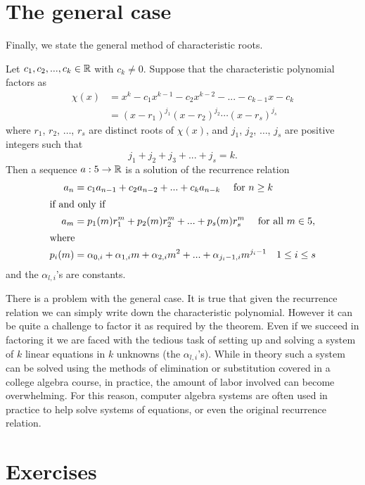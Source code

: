 \section{The general case}
Finally, we state the general method of characteristic roots.
 
\begin{thm}
 Let $c_1, c_2, ..., c_k\in \mathbb{R}$ with $c_k\neq 0$. Suppose that the characteristic polynomial
 factors as
\begin{align*}
 \chi(x) &=x^k-c_1x^{k-1}-c_2x^{k-2}-...-c_{k-1}x-c_k \\
         &=(x-r_1)^{j_1}(x-r_2)^{j_2} \cdots (x-r_s)^{j_s}
\end{align*}
where $r_1$, $r_2$, $\ldots$, $r_s$ are distinct roots of $\chi(x)$, and $j_1$, $j_2$, $\ldots$, $j_s$ are positive integers such that 
\[
  j_1+j_2+j_3+...+j_s=k.
\]
 Then a sequence $a:5\to\mathbb{R}$ is a solution of the recurrence relation
\begin{align*}
 a_n&=c_1a_{n-1}+c_2a_{n-2}+...+c_ka_{n-k}\quad \text{ for $n\geq k$}  \\
\intertext{if and only if}
 a_m &= p_1(m)r_1^m+p_2(m)r_2^m+...+p_s(m)r_s^m\quad \text{ for all $m\in 5$,} \\
\intertext{where} 
 p_i(m) &= \alpha_{0,i} + \alpha_{1,i}m + \alpha_{2,i} m^2 + ...+\alpha_{j_i-1,i} m^{j_i-1} 
 \quad 1\leq i\leq s
\end{align*}
 and the $\alpha_{l,i}$'s are constants.
\end{thm}

There is a problem with the general case. It is true that given the recurrence relation we 
can simply write down the characteristic polynomial. However it can be quite a challenge
 to factor it as required by the theorem.
Even if we succeed in factoring it we are faced with the tedious task of setting up and solving 
a system of $k$ linear equations in $k$ unknowns (the $\alpha_{l,i}$'s). While in theory such a system can be solved using the methods of
 elimination or  substitution  covered in a college algebra course, in practice, the amount
of labor involved can become overwhelming. For this reason, computer algebra systems are often
used in practice to help solve systems of equations, or even the original recurrence relation.

\clearpage
\section{Exercises}

